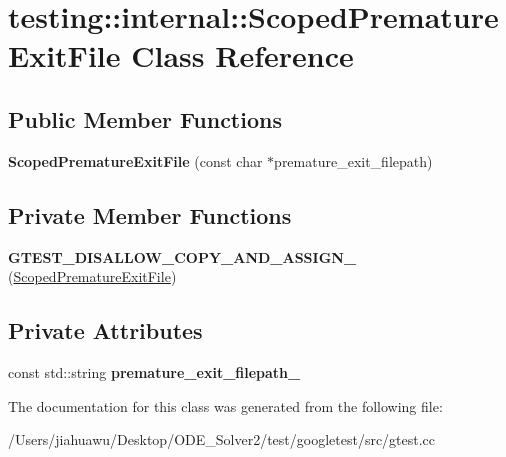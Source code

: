 \hypertarget{classtesting_1_1internal_1_1_scoped_premature_exit_file}{}\section{testing\+:\+:internal\+:\+:Scoped\+Premature\+Exit\+File Class Reference}
\label{classtesting_1_1internal_1_1_scoped_premature_exit_file}
\subsection*{Public Member Functions}
\begin{DoxyCompactItemize}
\item 
\mbox{\label{classtesting_1_1internal_1_1_scoped_premature_exit_file_ae520883b8a6984a864ce675acedff4a2}} 
{\bfseries Scoped\+Premature\+Exit\+File} (const char $\ast$premature\+\_\+exit\+\_\+filepath)
\end{DoxyCompactItemize}
\subsection*{Private Member Functions}
\begin{DoxyCompactItemize}
\item 
\mbox{\label{classtesting_1_1internal_1_1_scoped_premature_exit_file_a4c7a2d9d5a94035756b97b5c1e0c2597}} 
{\bfseries G\+T\+E\+S\+T\+\_\+\+D\+I\+S\+A\+L\+L\+O\+W\+\_\+\+C\+O\+P\+Y\+\_\+\+A\+N\+D\+\_\+\+A\+S\+S\+I\+G\+N\+\_\+} (\mbox{\hyperlink{classtesting_1_1internal_1_1_scoped_premature_exit_file}{Scoped\+Premature\+Exit\+File}})
\end{DoxyCompactItemize}
\subsection*{Private Attributes}
\begin{DoxyCompactItemize}
\item 
\mbox{\label{classtesting_1_1internal_1_1_scoped_premature_exit_file_ae5de9d1739a0adb381659321ca250d90}} 
const std\+::string {\bfseries premature\+\_\+exit\+\_\+filepath\+\_\+}
\end{DoxyCompactItemize}


The documentation for this class was generated from the following file\+:\begin{DoxyCompactItemize}
\item 
/\+Users/jiahuawu/\+Desktop/\+O\+D\+E\+\_\+\+Solver2/test/googletest/src/gtest.\+cc\end{DoxyCompactItemize}

